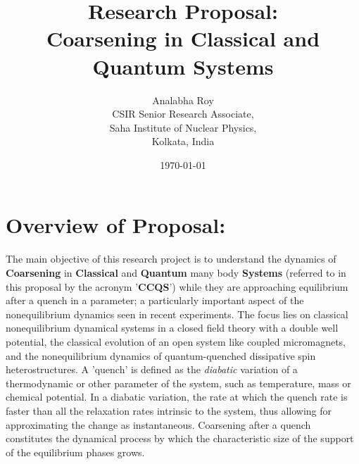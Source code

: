 \documentclass[a4paper,11pt,color]{article}
\title{Research Proposal:\\Coarsening in Classical and Quantum Systems}
\author{Analabha Roy\\CSIR Senior Research Associate,\\ Saha Institute of Nuclear Physics,\\ Kolkata, India}
\date{\today}
\begin{document}
 \maketitle


\section{Overview of Proposal:}
\label{sec:sciTec}
\label{sec:sciTecQuality}

The main objective of this research project is to understand the dynamics of \textbf{Coarsening} in \textbf{Classical} and \textbf{Quantum} many body \textbf{Systems} (referred to in this proposal by the acronym '\textbf{CCQS}') while they are approaching equilibrium after a quench in a  {parameter}; a particularly important aspect of the nonequilibrium dynamics seen in recent experiments. The focus lies on classical nonequilibrium dynamical systems in a closed field theory with a double well potential, the classical evolution of an open system like coupled micromagnets, and the nonequilibrium dynamics of quantum-quenched dissipative spin heterostructures. A 'quench' is defined as the \textit{diabatic} variation of a thermodynamic or other  {parameter} of the system, such as temperature, mass or chemical potential. In a diabatic variation, the rate at which the quench rate is faster than all the relaxation rates intrinsic to the system, thus allowing for approximating the change as instantaneous. Coarsening after a quench constitutes the dynamical process by which the characteristic  {size} of the support of the equilibrium phases grows.
\end{document}
